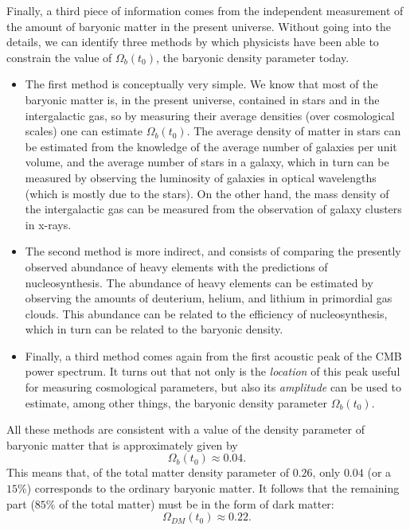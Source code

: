 \documentclass[11pt, a4paper,oneside,openright]{book}
\numberwithin{equation}{section}
\begin{document}
Finally, a third piece of information comes from the independent measurement of the amount of baryonic matter in the present universe. Without going into the details, we can identify three methods by which physicists have been able to constrain the value of $\Omega_b(t_0)$, the baryonic density parameter today.
\begin{itemize}
\item The first method is conceptually very simple. We know that most of the baryonic matter is, in the present universe, contained in stars and in the intergalactic gas, so by measuring their average densities (over cosmological scales) one can estimate $\Omega_b(t_0)$. The average density of matter in stars can be estimated from the knowledge of the average number of galaxies per unit volume, and the average number of stars in a galaxy, which in turn can be measured by observing the luminosity of galaxies in optical wavelengths (which is mostly due to the stars). On the other hand, the mass density of the intergalactic gas can be measured from the observation of galaxy clusters in x-rays.
\item The second method is more indirect, and consists of comparing the presently observed abundance of heavy elements with the predictions of nucleosynthesis. The abundance of heavy elements can be estimated by observing the amounts of deuterium, helium, and lithium in primordial gas clouds. This abundance can be related to the efficiency of nucleosynthesis, which in turn can be related to the baryonic density.
\item Finally, a third method comes again from the first acoustic peak of the CMB power spectrum. It turns out that not only is the {\it location} of this peak useful for measuring cosmological parameters, but also its {\it amplitude} can be used to estimate, among other things, the baryonic density parameter $\Omega_b(t_0)$.
\end{itemize}

All these methods are consistent with a value of the density parameter of baryonic matter that is approximately given by
\begin{equation}
\Omega_b(t_0)\approx 0.04.
\end{equation}
This means that, of the total matter density parameter of $0.26$, only $0.04$ (or a $15\%$) corresponds to the ordinary baryonic matter. It follows that the remaining part ($85\%$ of the total matter) must be in the form of dark matter:
\begin{equation}
\Omega_{DM}(t_0)\approx 0.22.
\end{equation}
\end{document}
